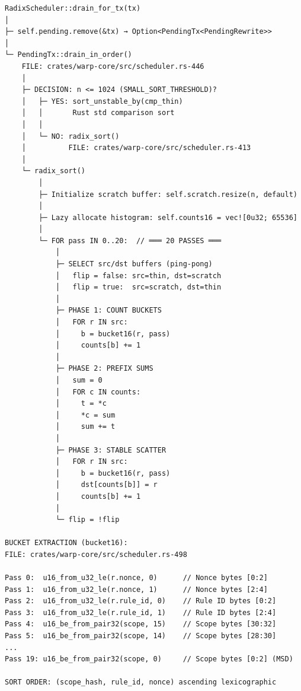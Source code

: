 \documentclass[11pt]{book}
\begin{document}
\begin{verbatim}
RadixScheduler::drain_for_tx(tx)
│
├─ self.pending.remove(&tx) → Option<PendingTx<PendingRewrite>>
│
└─ PendingTx::drain_in_order()
    FILE: crates/warp-core/src/scheduler.rs-446
    │
    ├─ DECISION: n <= 1024 (SMALL_SORT_THRESHOLD)?
    │   ├─ YES: sort_unstable_by(cmp_thin)
    │   │       Rust std comparison sort
    │   │
    │   └─ NO: radix_sort()
    │          FILE: crates/warp-core/src/scheduler.rs-413
    │
    └─ radix_sort()
        │
        ├─ Initialize scratch buffer: self.scratch.resize(n, default)
        │
        ├─ Lazy allocate histogram: self.counts16 = vec![0u32; 65536]
        │
        └─ FOR pass IN 0..20:  // ═══ 20 PASSES ═══
            │
            ├─ SELECT src/dst buffers (ping-pong)
            │   flip = false: src=thin, dst=scratch
            │   flip = true:  src=scratch, dst=thin
            │
            ├─ PHASE 1: COUNT BUCKETS
            │   FOR r IN src:
            │     b = bucket16(r, pass)
            │     counts[b] += 1
            │
            ├─ PHASE 2: PREFIX SUMS
            │   sum = 0
            │   FOR c IN counts:
            │     t = *c
            │     *c = sum
            │     sum += t
            │
            ├─ PHASE 3: STABLE SCATTER
            │   FOR r IN src:
            │     b = bucket16(r, pass)
            │     dst[counts[b]] = r
            │     counts[b] += 1
            │
            └─ flip = !flip

BUCKET EXTRACTION (bucket16):
FILE: crates/warp-core/src/scheduler.rs-498

Pass 0:  u16_from_u32_le(r.nonce, 0)      // Nonce bytes [0:2]
Pass 1:  u16_from_u32_le(r.nonce, 1)      // Nonce bytes [2:4]
Pass 2:  u16_from_u32_le(r.rule_id, 0)    // Rule ID bytes [0:2]
Pass 3:  u16_from_u32_le(r.rule_id, 1)    // Rule ID bytes [2:4]
Pass 4:  u16_be_from_pair32(scope, 15)    // Scope bytes [30:32]
Pass 5:  u16_be_from_pair32(scope, 14)    // Scope bytes [28:30]
...
Pass 19: u16_be_from_pair32(scope, 0)     // Scope bytes [0:2] (MSD)

SORT ORDER: (scope_hash, rule_id, nonce) ascending lexicographic
\end{verbatim}
\end{document}
